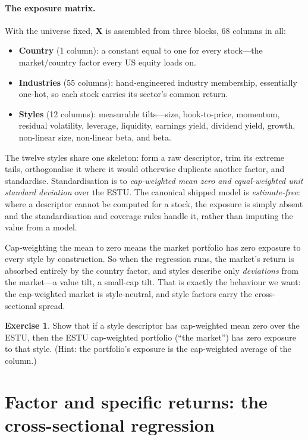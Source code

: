\documentclass[11pt]{article}
\theoremstyle{definition}
\newtheorem{exercise}{Exercise}[section]
\theoremstyle{plain}
\theoremstyle{remark}
\newcommand{\Xmat}{\mathbf{X}}
\begin{document}
\paragraph{The exposure matrix.} With the universe fixed, $\Xmat$ is assembled from three blocks, $68$ columns in all:
\begin{itemize}[leftmargin=1.4em,nosep]
  \item \textbf{Country} (1 column): a constant equal to one for every stock---the market/country factor every US equity loads on.
  \item \textbf{Industries} (55 columns): hand-engineered industry membership, essentially one-hot, so each stock carries its sector's common return.
  \item \textbf{Styles} (12 columns): measurable tilts---size, book-to-price, momentum, residual volatility, leverage, liquidity, earnings yield, dividend yield, growth, non-linear size, non-linear beta, and beta.
\end{itemize}

The twelve styles share one skeleton: form a raw descriptor, trim its extreme tails, orthogonalise it where it would otherwise duplicate another factor, and standardise. Standardisation is to \emph{cap-weighted mean zero and equal-weighted unit standard deviation} over the ESTU. The canonical shipped model is \emph{estimate-free}: where a descriptor cannot be computed for a stock, the exposure is simply absent and the standardisation and coverage rules handle it, rather than imputing the value from a model.

\begin{intuition}
Cap-weighting the mean to zero means the market portfolio has zero exposure to every style by construction. So when the regression runs, the market's return is absorbed entirely by the country factor, and styles describe only \emph{deviations} from the market---a value tilt, a small-cap tilt. That is exactly the behaviour we want: the cap-weighted market is style-neutral, and style factors carry the cross-sectional spread.
\end{intuition}

\begin{exercise}
Show that if a style descriptor has cap-weighted mean zero over the ESTU, then the ESTU cap-weighted portfolio (``the market'') has zero exposure to that style. (Hint: the portfolio's exposure is the cap-weighted average of the column.)
\end{exercise}

\section{Factor and specific returns: the cross-sectional regression}\label{sec:csr}
\end{document}
